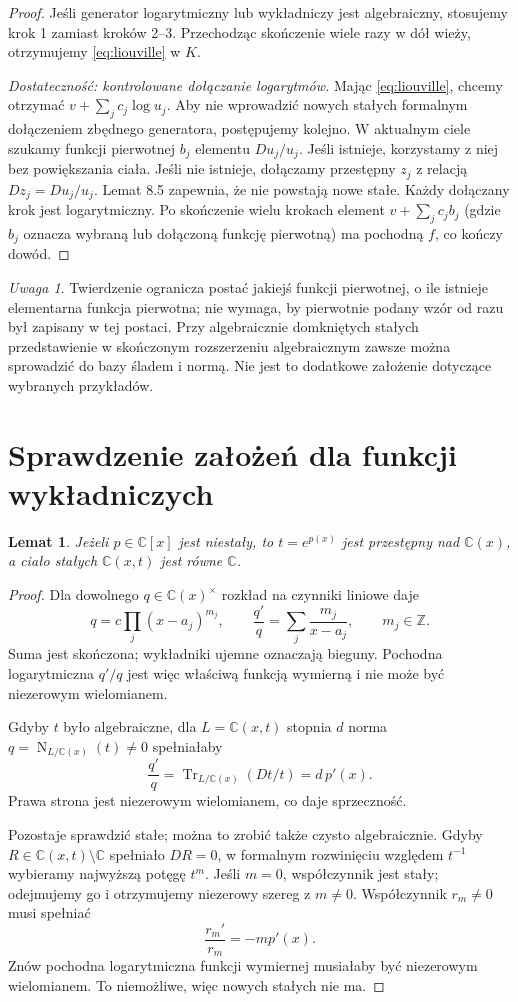 \documentclass[11pt,a4paper,oneside]{book}
\numberwithin{equation}{section}
\theoremstyle{plain}
\newtheorem{lemat}[twierdzenie]{Lemat}
\theoremstyle{definition}
\theoremstyle{remark}
\newtheorem{uwaga}[twierdzenie]{Uwaga}
\newcommand{\C}{\mathbb{C}}
\newcommand{\Z}{\mathbb{Z}}
\newcommand{\Tr}{\operatorname{Tr}}
\newcommand{\Nm}{\operatorname{N}}
\begin{document}
\begin{proof}
Jeśli generator logarytmiczny lub wykładniczy jest algebraiczny, stosujemy krok 1 zamiast kroków 2--3. Przechodząc skończenie wiele razy w dół wieży, otrzymujemy \eqref{eq:liouville} w $K$.

\emph{Dostateczność: kontrolowane dołączanie logarytmów.} Mając \eqref{eq:liouville}, chcemy otrzymać $v+\sum_j c_j\log u_j$. Aby nie wprowadzić nowych stałych formalnym dołączeniem zbędnego generatora, postępujemy kolejno. W aktualnym ciele szukamy funkcji pierwotnej $b_j$ elementu $Du_j/u_j$. Jeśli istnieje, korzystamy z niej bez powiększania ciała. Jeśli nie istnieje, dołączamy przestępny $z_j$ z relacją $Dz_j=Du_j/u_j$. Lemat 8.5 zapewnia, że nie powstają nowe stałe. Każdy dołączany krok jest logarytmiczny. Po skończenie wielu krokach element $v+\sum_j c_jb_j$ (gdzie $b_j$ oznacza wybraną lub dołączoną funkcję pierwotną) ma pochodną $f$, co kończy dowód.
\end{proof}

\begin{uwaga}
Twierdzenie ogranicza postać jakiejś funkcji pierwotnej, o ile istnieje elementarna funkcja pierwotna; nie wymaga, by pierwotnie podany wzór od razu był zapisany w tej postaci. Przy algebraicznie domkniętych stałych przedstawienie w skończonym rozszerzeniu algebraicznym zawsze można sprowadzić do bazy śladem i normą. Nie jest to dodatkowe założenie dotyczące wybranych przykładów.
\end{uwaga}

\section{Sprawdzenie założeń dla funkcji wykładniczych}

\begin{lemat}
Jeżeli $p\in\C[x]$ jest niestały, to $t=e^{p(x)}$ jest przestępny nad $\C(x)$, a ciało stałych $\C(x,t)$ jest równe $\C$.
\end{lemat}
\begin{proof}
Dla dowolnego $q\in\C(x)^\times$ rozkład na czynniki liniowe daje
\[
q=c\prod_j(x-a_j)^{m_j},\qquad
\frac{q'}{q}=\sum_j\frac{m_j}{x-a_j},\qquad m_j\in\Z.
\]
Suma jest skończona; wykładniki ujemne oznaczają bieguny. Pochodna logarytmiczna $q'/q$ jest więc właściwą funkcją wymierną i nie może być niezerowym wielomianem.

Gdyby $t$ było algebraiczne, dla $L=\C(x,t)$ stopnia $d$ norma $q=\Nm_{L/\C(x)}(t)\ne0$ spełniałaby
\[
\frac{q'}{q}=\Tr_{L/\C(x)}(Dt/t)=d\,p'(x).
\]
Prawa strona jest niezerowym wielomianem, co daje sprzeczność.

Pozostaje sprawdzić stałe; można to zrobić także czysto algebraicznie. Gdyby $R\in\C(x,t)\setminus\C$ spełniało $DR=0$, w formalnym rozwinięciu względem $t^{-1}$ wybieramy najwyższą potęgę $t^m$. Jeśli $m=0$, współczynnik jest stały; odejmujemy go i otrzymujemy niezerowy szereg z $m\ne0$. Współczynnik $r_m\ne0$ musi spełniać
\[
\frac{r_m'}{r_m}=-m p'(x).
\]
Znów pochodna logarytmiczna funkcji wymiernej musiałaby być niezerowym wielomianem. To niemożliwe, więc nowych stałych nie ma.
\end{proof}
\end{document}
